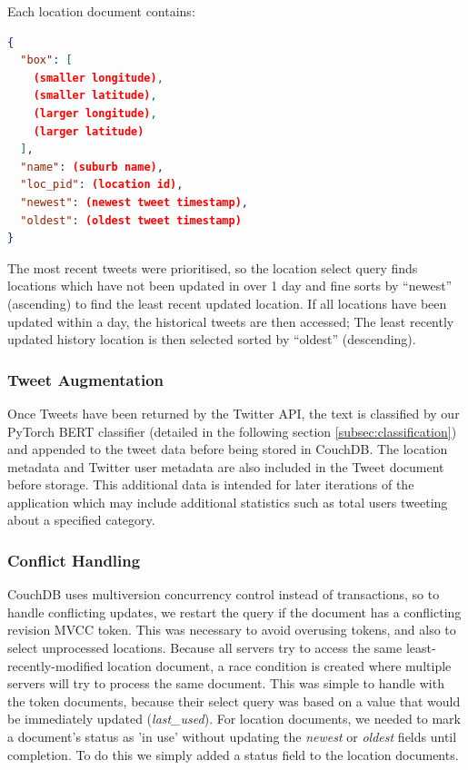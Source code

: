 \documentclass[parskip=full, 11pt]{article}
\begin{document}
Each location document contains:
\begin{lstlisting}[language=Json]
{
  "box": [
    (smaller longitude),
    (smaller latitude),
    (larger longitude),
    (larger latitude)
  ],
  "name": (suburb name),
  "loc_pid": (location id),
  "newest": (newest tweet timestamp),
  "oldest": (oldest tweet timestamp)
}
\end{lstlisting}

The most recent tweets were prioritised, so the location select query finds locations which have not been updated in over 1 day and fine sorts by “newest” (ascending) to find the least recent updated location.
If all locations have been updated within a day, the historical tweets are then accessed; The least recently updated history location is then selected sorted by “oldest” (descending).

\subsubsection{Tweet Augmentation}
Once Tweets have been returned by the Twitter API, the text is classified by our PyTorch BERT classifier (detailed in the following section \ref{subsec:classification}) and appended to the tweet data before being stored in CouchDB. The location metadata and Twitter user metadata are also included in the Tweet document before storage. This additional data is intended for later iterations of the application which may include additional statistics such as total users tweeting about a specified category.

\subsubsection{Conflict Handling}
\label{subsec:conflict_handling}
CouchDB uses multiversion concurrency control instead of transactions, so to handle conflicting updates, we restart the query if the document has a conflicting revision MVCC token.
This was necessary to avoid overusing tokens, and also to select unprocessed locations.
Because all servers try to access the same least-recently-modified location document, a race condition is created where multiple servers will try to process the same document.
This was simple to handle with the token documents, because their select query was based on a value that would be immediately updated (\emph{last\_used}). For location documents, we needed to mark a document's status as 'in use' without updating the \emph{newest} or \emph{oldest} fields until completion. To do this we simply added a status field to the location documents. \\
\end{document}
